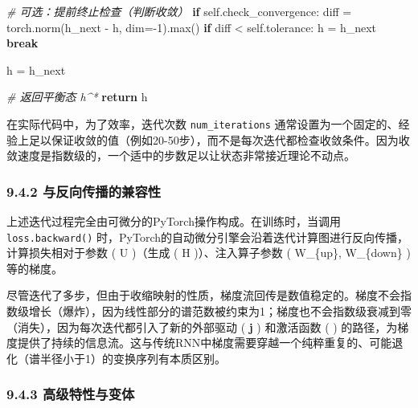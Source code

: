 \documentclass[
  12pt,
]{article}
\newenvironment{Shaded}{}{}
\newcommand{\BuiltInTok}[1]{#1}
\newcommand{\CommentTok}[1]{\textcolor[rgb]{0.38,0.63,0.69}{\textit{#1}}}
\newcommand{\ControlFlowTok}[1]{\textcolor[rgb]{0.00,0.44,0.13}{\textbf{#1}}}
\newcommand{\DecValTok}[1]{\textcolor[rgb]{0.25,0.63,0.44}{#1}}
\newcommand{\NormalTok}[1]{#1}
\newcommand{\OperatorTok}[1]{\textcolor[rgb]{0.40,0.40,0.40}{#1}}
\newcommand{\VariableTok}[1]{\textcolor[rgb]{0.10,0.09,0.49}{#1}}
\begin{document}
\begin{Shaded}
\begin{Highlighting}[]
            \CommentTok{\# 可选：提前终止检查（判断收敛）}
            \ControlFlowTok{if} \VariableTok{self}\NormalTok{.check\_convergence:}
\NormalTok{                diff }\OperatorTok{=}\NormalTok{ torch.norm(h\_next }\OperatorTok{{-}}\NormalTok{ h, dim}\OperatorTok{={-}}\DecValTok{1}\NormalTok{).}\BuiltInTok{max}\NormalTok{()}
                \ControlFlowTok{if}\NormalTok{ diff }\OperatorTok{\textless{}} \VariableTok{self}\NormalTok{.tolerance:}
\NormalTok{                    h }\OperatorTok{=}\NormalTok{ h\_next}
                    \ControlFlowTok{break}
                    
\NormalTok{            h }\OperatorTok{=}\NormalTok{ h\_next}
            
        \CommentTok{\# 返回平衡态 h\^{}*}
        \ControlFlowTok{return}\NormalTok{ h}
\end{Highlighting}
\end{Shaded}

在实际代码中，为了效率，迭代次数 \texttt{num\_iterations}
通常设置为一个固定的、经验上足以保证收敛的值（例如20-50步），而不是每次迭代都检查收敛条件。因为收敛速度是指数级的，一个适中的步数足以让状态非常接近理论不动点。

\hypertarget{ux4e0eux53cdux5411ux4f20ux64adux7684ux517cux5bb9ux6027}{%
\subsubsection{9.4.2
与反向传播的兼容性}\label{ux4e0eux53cdux5411ux4f20ux64adux7684ux517cux5bb9ux6027}}

上述迭代过程完全由可微分的PyTorch操作构成。在训练时，当调用
\texttt{loss.backward()}
时，PyTorch的自动微分引擎会沿着迭代计算图进行反向传播，计算损失相对于参数
( U )（生成 ( H )）、注入算子参数 ( W\_\{up\}, W\_\{down\} ) 等的梯度。

尽管迭代了多步，但由于收缩映射的性质，梯度流回传是数值稳定的。梯度不会指数级增长（爆炸），因为线性部分的谱范数被约束为1；梯度也不会指数级衰减到零（消失），因为每次迭代都引入了新的外部驱动
( \textbf{j} ) 和激活函数 ( \sigma )
的路径，为梯度提供了持续的信息流。这与传统RNN中梯度需要穿越一个纯粹重复的、可能退化（谱半径小于1）的变换序列有本质区别。

\hypertarget{ux9ad8ux7ea7ux7279ux6027ux4e0eux53d8ux4f53}{%
\subsubsection{9.4.3
高级特性与变体}\label{ux9ad8ux7ea7ux7279ux6027ux4e0eux53d8ux4f53}}
\end{document}
